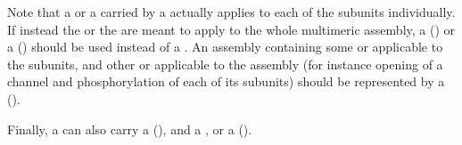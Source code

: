 \begin{glyphDescription}
Note that a  or a  carried by a  actually applies to each of the subunits individually.
If instead the  or the  are meant to apply to the whole multimeric assembly, a  () or a  () should be used instead of a .
An assembly containing some  or  applicable to the subunits, and other  or  applicable to the assembly (for instance opening of a channel and phosphorylation of each of its subunits) should be represented by a  ().

Finally, a  can also carry a  (), and a ,  or  a  ().

\end{glyphDescription}

